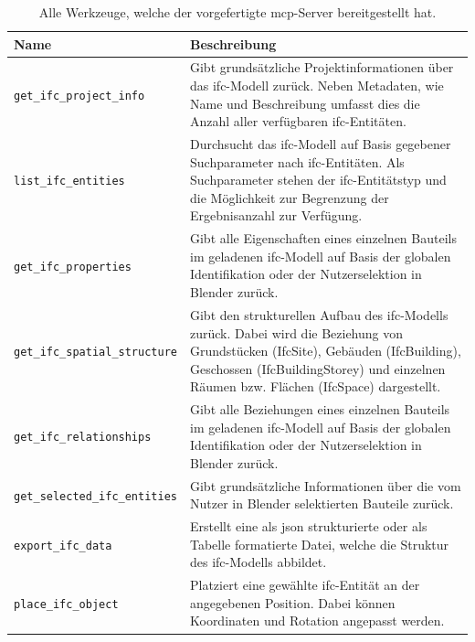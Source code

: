 \begin{table}[!htb]
    \centering
    \caption[Bereitgestellte Werkzeuge vom vorgefertigten \gls{mcp}-Server]{Alle Werkzeuge, welche der vorgefertigte \gls{mcp}-Server bereitgestellt hat.}
    \label{tab:iteration1tools}
    \begin{tabular}{L{6cm} L{8cm}}
        \hline
        \textbf{Name} & \textbf{Beschreibung} \\
        \hline

        \texttt{get\_ifc\_project\_info} & Gibt grundsätzliche Projektinformationen über das \gls{ifc}-Modell zurück. Neben Metadaten, wie Name und Beschreibung umfasst dies die Anzahl aller verfügbaren \gls{ifc}-Entitäten. \\

        \texttt{list\_ifc\_entities} & Durchsucht das \gls{ifc}-Modell auf Basis gegebener Suchparameter nach \gls{ifc}-Entitäten. Als Suchparameter stehen der \gls{ifc}-Entitätstyp und die Möglichkeit zur Begrenzung der Ergebnisanzahl zur Verfügung.  \\

        \texttt{get\_ifc\_properties} & Gibt alle Eigenschaften eines einzelnen Bauteils im geladenen \gls{ifc}-Modell auf Basis der globalen Identifikation oder der Nutzerselektion in Blender zurück. \\

        \texttt{get\_ifc\_spatial\_structure} & Gibt den strukturellen Aufbau des \gls{ifc}-Modells zurück. Dabei wird die Beziehung von Grundstücken (IfcSite), Gebäuden (IfcBuilding), Geschossen (IfcBuildingStorey) und einzelnen Räumen bzw. Flächen (IfcSpace) dargestellt. \\

        \texttt{get\_ifc\_relationships} & Gibt alle Beziehungen eines einzelnen Bauteils im geladenen \gls{ifc}-Modell auf Basis der globalen Identifikation oder der Nutzerselektion in Blender zurück. \\

        \texttt{get\_selected\_ifc\_entities} & Gibt grundsätzliche Informationen über die vom Nutzer in Blender selektierten Bauteile zurück. \\

        \texttt{export\_ifc\_data} & Erstellt eine als \gls{json} strukturierte oder als Tabelle formatierte Datei, welche die Struktur des \gls{ifc}-Modells abbildet. \\

        \texttt{place\_ifc\_object} & Platziert eine gewählte \gls{ifc}-Entität an der angegebenen Position. Dabei können Koordinaten und Rotation angepasst werden. \\


\end{tabular}
\end{table}
